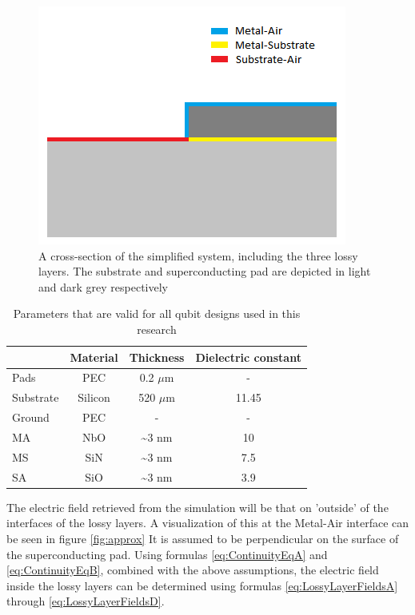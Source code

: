 \begin{figure}
	\begin{center}
		\includegraphics[scale=.8]{Figures/model}
		\caption{A cross-section of the simplified system, including the three lossy layers. The substrate and superconducting pad are depicted in light and dark grey respectively}
		\label{fig:model}
	\end{center}
\end{figure}

\begin{table}
	\begin{center}
		\begin{tabular}{ | l || c | c | c |}
			\hline
			& Material & Thickness & Dielectric constant \\ \hline
			Pads & PEC & 0.2 \(\mu\)m & - \\
			Substrate & Silicon & 520 \(\mu\)m & 11.45 \\
			Ground & PEC & - & - \\
			MA & NbO & \textasciitilde 3 nm & 10 \\
			MS & SiN & \textasciitilde 3 nm & 7.5 \\
			SA & SiO & \textasciitilde 3 nm & 3.9 \\
			\hline
		\end{tabular}
	\end{center}
	\caption{Parameters that are valid for all qubit designs used in this research}
	\label{table:standard_parameters}
\end{table}

The electric field retrieved from the simulation will be that on 'outside' of the interfaces of the lossy layers. A visualization of this at the Metal-Air interface can be seen in figure \ref{fig:approx} It is assumed to be perpendicular on the surface of the superconducting pad. Using formulas \eqref{eq:ContinuityEqA} and \eqref{eq:ContinuityEqB}, combined with the above assumptions, the electric field inside the lossy layers can be determined using formulas \eqref{eq:LossyLayerFieldsA} through \eqref{eq:LossyLayerFieldsD}.

